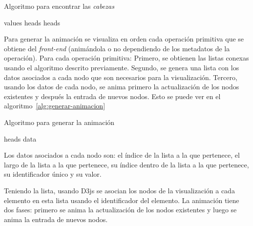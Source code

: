 \begin{algorithm}[htb]
  \caption{Algoritmo para encontrar las \textit{cabezas}}
  \label{alg:encontrar-cabezas}
  \begin{algorithmic}[1]
    \State values \gets {}
    \State heads \gets {} 
    \State \Return heads
  \EndFunction
  \end{algorithmic}
\end{algorithm}

Para generar la animación se visualiza en orden cada operación primitiva que se obtiene del \textit{front-end} (animándola o no dependiendo de los metadatos de la operación). Para cada operación primitiva: Primero, se obtienen las listas conexas usando el algoritmo descrito previamente. Segundo, se genera una lista con los datos asociados a cada nodo que son necesarios para la visualización. Tercero, usando los datos de cada nodo, se anima primero la actualización  de los nodos existentes y después la entrada de nuevos nodos. Esto se puede ver en el algoritmo~\ref{alg:generar-animacion} 

\begin{algorithm}[htb]
  \caption{Algoritmo para generar la animación}
  \label{alg:generar-animacion}
  \begin{algorithmic}[1]
    \State heads \gets {}
    \State data \gets {} 

    \State {} 
    \State {} 
    \State \Return
  \EndFunction
  \end{algorithmic}
\end{algorithm}

Los datos asociados a cada nodo son: el índice de la lista a la que pertenece, el largo de la lista a la que pertenece, su índice dentro de la lista a la que pertenece, su identificador único y su valor.

Teniendo la lista, usando D3js se asocian los nodos de la visualización a cada elemento en esta lista usando el identificador del elemento. La animación tiene dos fases: primero se anima la actualización de los nodos existentes y luego se anima la entrada de nuevos nodos.

